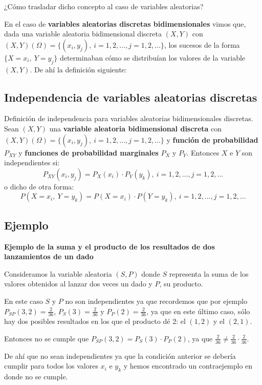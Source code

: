 \documentclass[]{book}
\begin{document}
¿Cómo trasladar dicho concepto al caso de variables aleatorias?

En el caso de \textbf{variables aleatorias discretas bidimensionales} vimos que, dada una variable aleatoria bidimensional discreta \((X,Y)\) con \((X,Y)(\Omega)=\{(x_i,y_j),\ i=1,2,\ldots,j=1,2,\ldots\}\), los sucesos de la forma \(\{X=x_i,\  Y=y_j\}\) determinaban cómo se distribuían los valores de la variable \((X,Y)\). De ahí la definición siguiente:

\hypertarget{independencia-de-variables-aleatorias-discretas-1}{%
\subsection{Independencia de variables aleatorias discretas}\label{independencia-de-variables-aleatorias-discretas-1}}

Definición de independencia para variables aleatorias bidimensionales discretas.
Sean \((X,Y)\) una \textbf{variable aleatoria bidimensional discreta} con \((X,Y)(\Omega)=\{(x_i,y_j),\ i=1,2,\ldots,j=1,2,\ldots\}\) y \textbf{función de probabilidad} \(P_{XY}\) y \textbf{funciones de probabilidad marginales} \(P_X\) y \(P_Y\). Entonces \(X\) e \(Y\) son independientes si:
\[
P_{XY}(x_i,y_j)=P_X(x_i)\cdot P_Y(y_k),\ i=1,2,\ldots,j=1,2,\ldots
\]
o dicho de otra forma:
\[
P(X=x_i,\ Y=y_k)=P(X=x_i)\cdot P(Y=y_k),\ i=1,2,\ldots,j=1,2,\ldots
\]

\hypertarget{ejemplo-55}{%
\subsection{Ejemplo}\label{ejemplo-55}}

\textbf{Ejemplo de la suma y el producto de los resultados de dos lanzamientos de un dado}

Consideramos la variable aleatoria \((S,P)\) donde \(S\) representa la suma de los valores obtenidos al lanzar dos veces un dado y \(P\), su producto.

En este caso \(S\) y \(P\) no son independientes ya que recordemos que por ejemplo \(P_{SP}(3,2)=\frac{2}{36}\), \(P_S(3)=\frac{2}{36}\) y \(P_P(2)=\frac{2}{36}\), ya que en este último caso, sólo hay dos posibles resultados en los que el producto dé 2: el \((1,2)\) y el \((2,1)\).

Entonces no se cumple que \(P_{SP}(3,2)=P_S(3)\cdot P_P(2)\), ya que \(\frac{2}{36}\neq \frac{2}{36}\cdot \frac{2}{36}\).

De ahí que no sean independientes ya que la condición anterior se debería cumplir para todos los valores \(x_i\) e \(y_k\) y hemos encontrado un contraejemplo en donde no se cumple.
\end{document}

